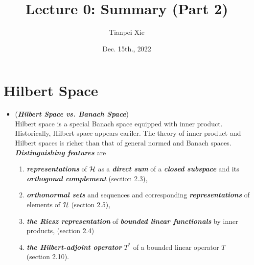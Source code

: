 \documentclass[11pt]{article}
\begin{document}
\title{Lecture 0: Summary (Part 2)}
\author{ Tianpei Xie}
\date{ Dec. 15th., 2022 }
\maketitle
\tableofcontents
\newpage
\section{Hilbert Space}
\begin{itemize}
\item \begin{remark} (\emph{\textbf{Hilbert Space vs. Banach Space}})\\
Hilbert space is a special Banach space equipped with inner product. Historically, Hilbert space appears eariler.  The theory of inner product and Hilbert spaces is richer than that of general normed and Banach spaces. \emph{\textbf{Distinguishing features}} are
\begin{enumerate}
\item  \textbf{\emph{representations}} of ${\mathcal H}$ as a \emph{\textbf{direct sum}} of a \emph{\textbf{closed subspace}} and its \emph{\textbf{orthogonal complement}} (section 2.3),
\item \emph{\textbf{orthonormal sets}} and sequences and corresponding \emph{\textbf{representations}} of elements of ${\mathcal H}$ (section 2.5),
\item \emph{\textbf{the Riesz representation}} of \emph{\textbf{bounded linear functionals}} by inner products, (section 2.4)
\item \emph{\textbf{the Hilbert-adjoint operator}} $T^{*}$ of a bounded linear operator $T$ (section 2.10).
\end{enumerate}
\end{remark}
\end{itemize}
\end{document}
